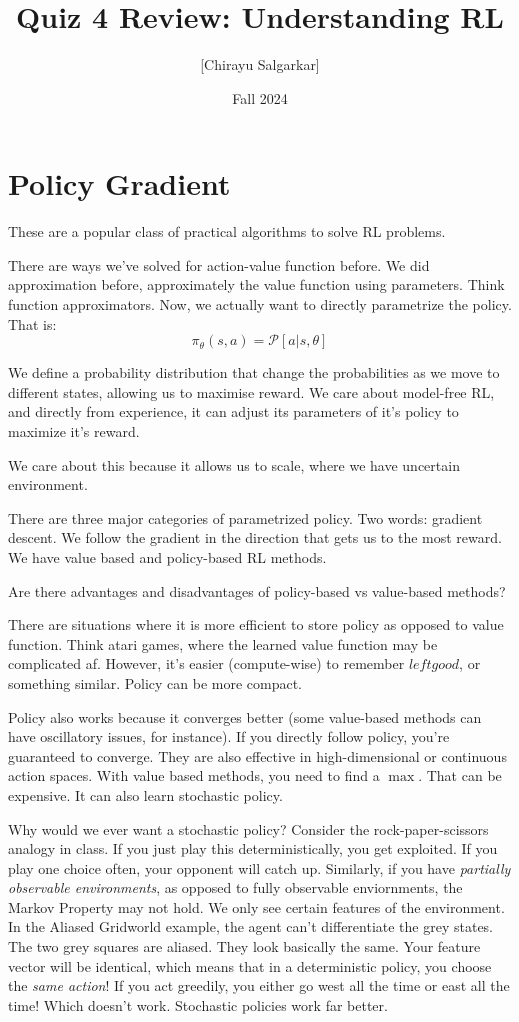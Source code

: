 \documentclass[10pt, oneside]{article}
\title{Quiz 4 Review: Understanding RL}
\author{[Chirayu Salgarkar]}
\date{Fall 2024}
\theoremstyle{definition}
\begin{document}
\maketitle
\tableofcontents
\section{Policy Gradient}
These are a popular class of practical algorithms to solve RL problems.

There are ways we've solved for action-value function before. We did approximation before, approximately the value function using parameters. Think function approximators. Now, we actually want to directly parametrize the policy. That is:
\[\pi_\theta(s,a) = \mathcal{P}[a | s,\theta] \]

We define a probability distribution that change the probabilities as we move to different states, allowing us to maximise reward. We care about model-free RL, and directly from experience, it can adjust its parameters of it's policy to maximize it's reward. 

We care about this because it allows us to scale, where we have uncertain environment. 

There are three major categories of parametrized policy. Two words: gradient descent. We follow the gradient in the direction that gets us to the most reward. We have value based and policy-based RL methods. 

Are there advantages and disadvantages of policy-based vs value-based methods?

There are situations where it is more efficient to store policy as opposed to value function. Think atari games, where the learned value function may be complicated af. However, it's easier (compute-wise) to remember $left good$, or something similar. Policy can be more compact.

Policy also works because it converges better (some value-based methods can have oscillatory issues, for instance). If you directly follow policy, you're guaranteed to converge. They are also effective in high-dimensional or continuous action spaces. With value based methods, you need to find a $\max$. That can be expensive. It can also learn stochastic policy.

Why would we ever want a stochastic policy? Consider the rock-paper-scissors analogy in class. If you just play this deterministically, you get exploited. If you play one choice often, your opponent will catch up. Similarly, if you have \textit{partially observable environments}, as opposed to fully observable enviornments, the Markov Property may not hold. We only see certain features of the environment. In the Aliased Gridworld example, the agent can't differentiate the grey states. The two grey squares are aliased. They look basically the same. Your feature vector will be identical, which means that in a deterministic policy, you choose the \textit{same action}! If you act greedily, you either go west all the time or east all the time! Which doesn't work. 
Stochastic policies work far better. 
\end{document}
